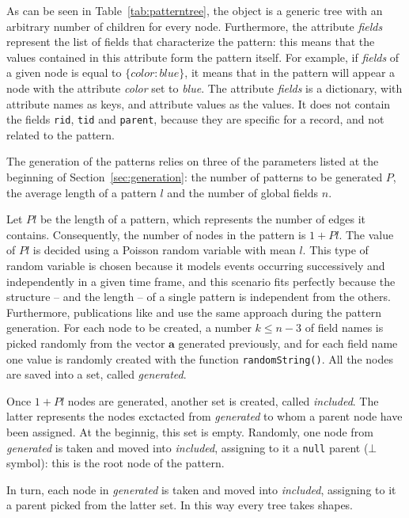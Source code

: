 \documentclass{acm_proc_article-sp-sigmod09}
\begin{document}
As can be seen in Table~\ref{tab:patterntree}, the object is a generic tree with an arbitrary number of children for every node. Furthermore, the attribute \emph{fields} represent the list of fields that characterize the pattern: this means that the values contained in this attribute form the pattern itself. For example, if \emph{fields} of a given node is equal to $ \{ color : blue \} $, it means that in the pattern will appear a node with the attribute \emph{color} set to \emph{blue}. The attribute \emph{fields} is a dictionary, with attribute names as keys, and attribute values as the values. It does not contain the fields \texttt{rid}, \texttt{tid} and \texttt{parent}, because they are specific for a record, and not related to the pattern.

The generation of the patterns relies on three of the parameters listed at the beginning of Section~\ref{sec:generation}: the number of patterns to be generated $P$, the average length of a pattern $l$ and the number of global fields $n$.

Let $Pl$ be the length of a pattern, which represents the number of edges it contains. Consequently, the number of nodes in the pattern is $1 + Pl$. The value of $Pl$ is decided using a Poisson random variable with mean $l$. This type of random variable is chosen because it models events occurring successively and independently in a given time frame, and this scenario fits perfectly because the structure -- and the length -- of a single pattern is independent from the others. Furthermore, publications like \cite{agrawal1994fast} and \cite{ivancsy2006time} use the same approach during the pattern generation. For each node to be created, a number $k \le n - 3$ of field names is picked randomly from the vector $\boldsymbol{a}$ generated previously, and for each field name one value is randomly created with the function \texttt{randomString()}. All the nodes are saved into a set, called \emph{generated}.

Once $1 + Pl$ nodes are generated, another set is created, called \emph{included}. The latter represents the nodes exctacted from \emph{generated} to whom a parent node have been assigned. At the beginnig, this set is empty. Randomly, one node from \emph{generated} is taken and moved into \emph{included}, assigning to it a \texttt{null} parent ($\bot$ symbol): this is the root node of the pattern. 

In turn, each node in \emph{generated} is taken and moved into \emph{included}, assigning to it a parent picked from the latter set. In this way every tree takes shapes.
\end{document}
